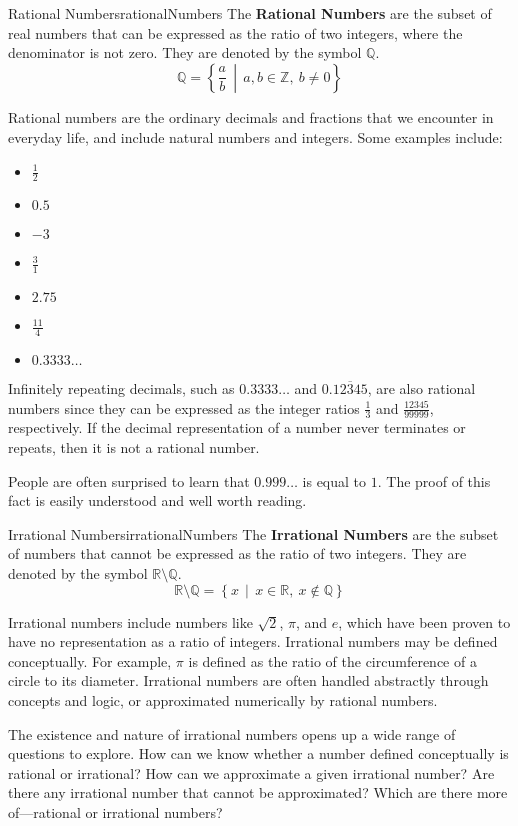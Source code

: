 \begin{definition}{Rational Numbers}{rationalNumbers}
  The \textbf{Rational Numbers} are the subset of real numbers that can be expressed as the
  ratio of two integers, where the denominator is not zero. They are denoted by
  the symbol \(\mathbb{Q}\).
  \[
    \mathbb{Q} = \left\{ \frac{a}{b} \,\middle|\, a, b \in \mathbb{Z},\ b \ne 0 \right\}
  \]
\end{definition}

Rational numbers are the ordinary decimals and fractions that we encounter in everyday life, and include
natural numbers and integers. Some examples include:
\begin{itemize}
\item \(\frac{1}{2}\)
\item \(0.5\)
\item \(-3\)
\item \(\frac{3}{1}\)
\item \(2.75\)
\item \(\frac{11}{4}\)
\item \(0.3333\ldots\)
\end{itemize}

Infinitely repeating decimals, such as \(0.3333\ldots\) and \(0.\overline{12345}\), are also rational
numbers since they can be expressed as the integer ratios \(\frac{1}{3}\) and \(\frac{12345}{99999}\),
respectively. If the decimal representation of a number never terminates or repeats, then it is
not a rational number.

\begin{advancedTopic}
  People are often surprised to learn that \( 0.999\ldots \) is equal to \( 1 \). The proof of this
  fact is easily understood and well worth reading.
\end{advancedTopic}

\begin{definition}{Irrational Numbers}{irrationalNumbers}
  The \textbf{Irrational Numbers} are the subset of numbers that cannot be expressed
  as the ratio of two integers. They are denoted by the symbol \(\mathbb{R} \setminus \mathbb{Q}\).
  \[
    \mathbb{R} \setminus \mathbb{Q} = \left\{ x \,\middle|\, x \in \mathbb{R},\ x \notin \mathbb{Q} \right\}
  \]
\end{definition}

Irrational numbers include numbers like \(\sqrt{2}\), \(\pi\), and \( e \), which have been proven to
have no representation as a ratio of integers. Irrational numbers may be defined conceptually. For
example, \(\pi\) is defined as the ratio of the circumference of a circle to its diameter. Irrational
numbers are often handled abstractly through concepts and logic, or approximated numerically by rational numbers.

\begin{advancedTopic}
  The existence and nature of irrational numbers opens up a wide range of questions to explore. How can we know
  whether a number defined conceptually is rational or irrational? How can we approximate a given irrational
  number? Are there any irrational number that cannot be approximated? Which are there more of—rational or
  irrational numbers?
\end{advancedTopic}
